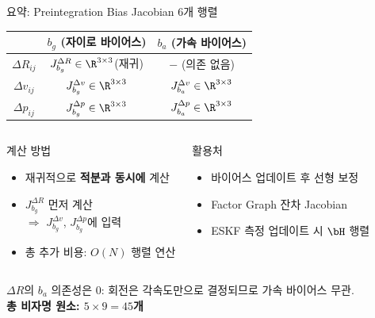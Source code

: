 
\begin{frame}[shrink=15]{요약: Preintegration Bias Jacobian 6개 행렬}

  \begin{center}
  \renewcommand{\arraystretch}{1.6}
  \begin{tabular}{c|cc}
    \toprule
    & $b_g$ (자이로 바이어스) & $b_a$ (가속 바이어스) \\
    \midrule
    $\Delta R_{ij}$
      & $J_{b_g}^{\Delta R} \in \R^{3\times 3}$\;(재귀)
      & $-$ (의존 없음) \\
    $\Delta v_{ij}$
      & $J_{b_g}^{\Delta v} \in \R^{3\times 3}$
      & $J_{b_a}^{\Delta v} \in \R^{3\times 3}$ \\
    $\Delta p_{ij}$
      & $J_{b_g}^{\Delta p} \in \R^{3\times 3}$
      & $J_{b_a}^{\Delta p} \in \R^{3\times 3}$ \\
    \bottomrule
  \end{tabular}
  \end{center}

  \pause
  \vspace{0.4em}
  \begin{columns}
    \begin{block}{계산 방법}
      \begin{itemize}
        \item 재귀적으로 \textbf{적분과 동시에} 계산
        \item $J_{b_g}^{\Delta R}$ 먼저 계산\\
          $\Rightarrow$ $J_{b_g}^{\Delta v}$, $J_{b_g}^{\Delta p}$에 입력
        \item 총 추가 비용: $O(N)$ 행렬 연산
      \end{itemize}
    \end{block}
    \begin{alertblock}{활용처}
      \begin{itemize}
        \item 바이어스 업데이트 후 선형 보정
        \item Factor Graph 잔차 Jacobian
        \item ESKF 측정 업데이트 시 $\bH$ 행렬
      \end{itemize}
    \end{alertblock}
  \end{columns}

  \pause
  \vspace{0.2em}
  \begin{center}
    \small
    $\Delta R$의 $b_a$ 의존성은 0: 회전은 각속도만으로 결정되므로 가속 바이어스 무관.\\
    \textbf{총 비자명 원소: $5 \times 9 = 45$개}
  \end{center}
\end{frame}

